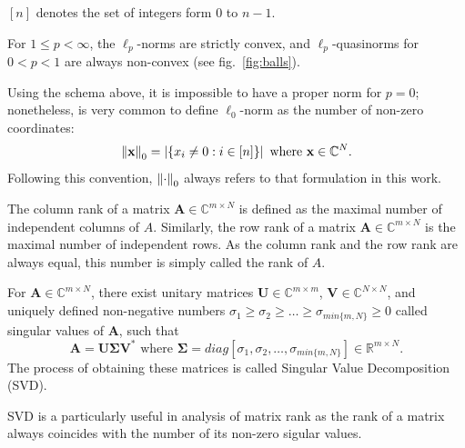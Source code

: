 \begin{tight_equations}
\begin{notation}
$[n]$ denotes the set of integers form $0$ to $n-1$.
\end{notation}

\begin{remark}
For $1 \le p < \infty$, the $\ell_p$-norms are strictly convex, and $\ell_p$-quasinorms for $0 < p < 1$ are always non-convex (see fig.~\ref{fig:balls}).
\end{remark}

\begin{remark}
Using the schema above, it is impossible to have a proper norm for $p = 0$; nonetheless, is very common to define $\ell_0$-norm as the number of non-zero coordinates:
\[\left\lVert\mathbf{x}\right\rVert_0 = \left| \left\{x_i \ne 0 : i \in [n]\right\}\right| \text{ where } \mathbf{x} \in \mathbb{C}^N.\]
Following this convention, $\left\lVert\cdot\right\rVert_0$ always refers to that formulation in this work.
\end{remark}


\begin{definition}
The column rank of a matrix $\mathbf{A} \in \mathbb{C}^{m \times N}$ is defined as the maximal number of independent columns of $A$. Similarly, the row rank of a matrix $\mathbf{A} \in \mathbb{C}^{m \times N}$ is the maximal number of independent rows. As the column rank and the row rank are always equal, this number is simply called the rank of $A$.
\end{definition}

\begin{theorem}[SVD]
For $\mathbf{A} \in \mathbb{C}^{m \times N}$, there exist unitary matrices $\mathbf{U} \in \mathbb{C}^{m \times m}$, $\mathbf{V} \in \mathbb{C}^{N \times N}$, and uniquely defined non-negative numbers $\sigma_1 \ge \sigma_2 \ge \ldots \ge \sigma_{min\{m,N\}} \ge 0$ called singular values of $\mathbf{A}$, such that 
\[\mathbf{A} = \mathbf{U \Sigma V^*} \text{ where } \mathbf{\Sigma} = diag[\sigma_1, \sigma_2, \ldots, \sigma_{min\{m,N\}}] \in \mathbb{R}^{m \times N}.\]
The process of obtaining these matrices is called Singular Value Decomposition (SVD).
\end{theorem}

\begin{remark}
SVD is a particularly useful in analysis of matrix rank as the rank of a matrix always coincides with the number of its non-zero sigular values.
\end{remark}


\end{tight_equations}
